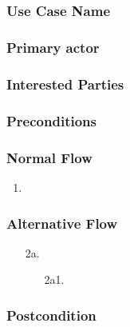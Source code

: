 \subsection{}

\subsubsection{Use Case Name}

\subsubsection{Primary actor}

\subsubsection{Interested Parties}

\subsubsection{Preconditions}

\subsubsection{Normal Flow}
\begin{enumerate}
	\item 
\end{enumerate}

\subsubsection{Alternative Flow}
\begin{enumerate}
	\item[2a.] 
	\begin{enumerate}
		\item[2a1.] 
	\end{enumerate}
\end{enumerate}

\subsubsection{Postcondition}

